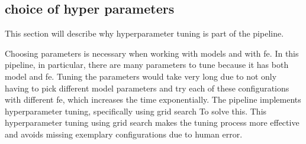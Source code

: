 \subsection{choice of hyper parameters}
This section will describe why hyperparameter tuning is part of the pipeline. 

Choosing parameters is necessary when working with models and with \gls{fe}. In this pipeline, in particular, there are many parameters to tune because it has both model and \gls{fe}. Tuning the parameters would take very long due to not only having to pick different model parameters and try each of these configurations with different \gls{fe}, which increases the time exponentially. The pipeline implements hyperparameter tuning, specifically using grid search To solve this. This hyperparameter tuning using grid search makes the tuning process more effective and avoids missing exemplary configurations due to human error.